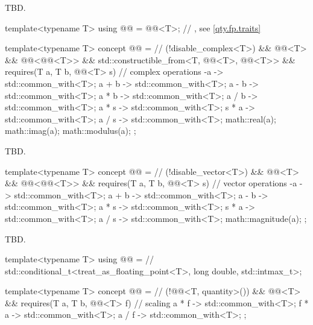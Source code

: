 \pnum
TBD.

\begin{itemdecl}
template<typename T>
using @@ = @@<T>;  // \expos, see \ref{qty.fp.traits}

template<typename T>
concept @@ =  // \expos
  (!disable_complex<T>) && @@<T> && @@<@@<T>> &&
  std::constructible_from<T, @@<T>, @@<T>> &&
  requires(T a, T b, @@<T> s) {
    // complex operations
    { -a } -> std::common_with<T>;
    { a + b } -> std::common_with<T>;
    { a - b } -> std::common_with<T>;
    { a * b } -> std::common_with<T>;
    { a / b } -> std::common_with<T>;
    { a * s } -> std::common_with<T>;
    { s * a } -> std::common_with<T>;
    { a / s } -> std::common_with<T>;
    math::real(a);
    math::imag(a);
    math::modulus(a);
  };
\end{itemdecl}

\pnum
TBD.

\begin{itemdecl}
template<typename T>
concept @@ =  // \expos
  (!disable_vector<T>) && @@<T> && @@<@@<T>> &&
  requires(T a, T b, @@<T> s) {
    // vector operations
    { -a } -> std::common_with<T>;
    { a + b } -> std::common_with<T>;
    { a - b } -> std::common_with<T>;
    { a * s } -> std::common_with<T>;
    { s * a } -> std::common_with<T>;
    { a / s } -> std::common_with<T>;
    math::magnitude(a);
  };
\end{itemdecl}

\pnum
TBD.

\begin{itemdecl}
template<typename T>
using @@ =  // \expos
  std::conditional_t<treat_as_floating_point<T>, long double, std::intmax_t>;

template<typename T>
concept @@ =  // \expos
  (!@@<T, quantity>()) && @@<T> &&
  requires(T a, T b, @@<T> f) {
    // scaling
    { a * f } -> std::common_with<T>;
    { f * a } -> std::common_with<T>;
    { a / f } -> std::common_with<T>;
  };
\end{itemdecl}


